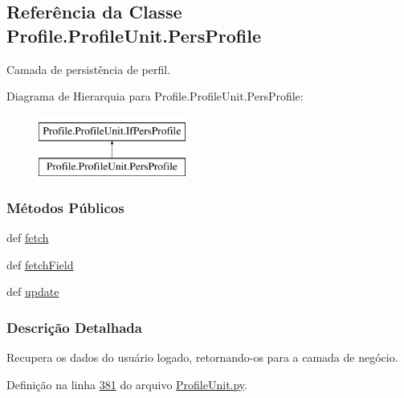 \hypertarget{classProfile_1_1ProfileUnit_1_1PersProfile}{\subsection{Referência da Classe Profile.\-Profile\-Unit.\-Pers\-Profile}
\label{classProfile_1_1ProfileUnit_1_1PersProfile}
}


Camada de persistência de perfil.  


Diagrama de Hierarquia para Profile.\-Profile\-Unit.\-Pers\-Profile\-:\begin{figure}[H]
\begin{center}
\leavevmode
\includegraphics[height=2.000000cm]{d7/dec/classProfile_1_1ProfileUnit_1_1PersProfile}
\end{center}
\end{figure}
\subsubsection*{Métodos Públicos}
\begin{DoxyCompactItemize}
\item 
def \hyperlink{classProfile_1_1ProfileUnit_1_1PersProfile_aca301abc09bc12a7cf0a61437f941a8a}{fetch}
\item 
def \hyperlink{classProfile_1_1ProfileUnit_1_1PersProfile_a68ab67bed74c46b72216e256af8f6711}{fetch\-Field}
\item 
def \hyperlink{classProfile_1_1ProfileUnit_1_1PersProfile_af1e4b3cf0eee0a14b5113210503ff665}{update}
\end{DoxyCompactItemize}


\subsubsection{Descrição Detalhada}
Recupera os dados do usuário logado, retornando-\/os para a camada de negócio. 

Definição na linha \hyperlink{ProfileUnit_8py_source_l00381}{381} do arquivo \hyperlink{ProfileUnit_8py_source}{Profile\-Unit.\-py}.



